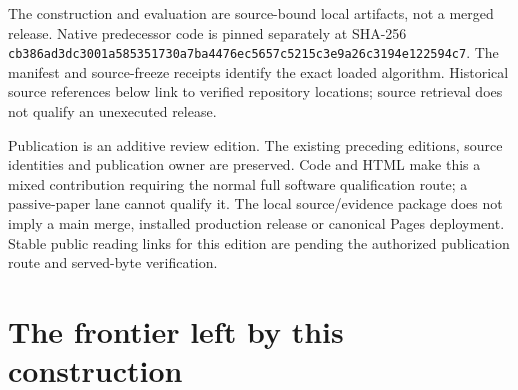 \documentclass[10pt,letterpaper]{article}
\begin{document}
The construction and evaluation are source-bound local artifacts, not a
merged release. Native predecessor code is pinned separately at SHA-256
\nolinkurl{cb386ad3dc3001a585351730a7ba4476ec5657c5215c3e9a26c3194e122594c7}.
The manifest and source-freeze receipts identify the exact loaded
algorithm. Historical source references below link to verified
repository locations; source retrieval does not qualify an unexecuted
release.

Publication is an additive review edition. The existing preceding
editions, source identities and publication owner are preserved. Code
and HTML make this a mixed contribution requiring the normal full
software qualification route; a passive-paper lane cannot qualify it.
The local source/evidence package does not imply a main merge, installed
production release or canonical Pages deployment. Stable public reading
links for this edition are pending the authorized publication route and
served-byte verification.

\hypertarget{the-frontier-left-by-this-construction}{%
\section{The frontier left by this
construction}\label{the-frontier-left-by-this-construction}}
\end{document}
